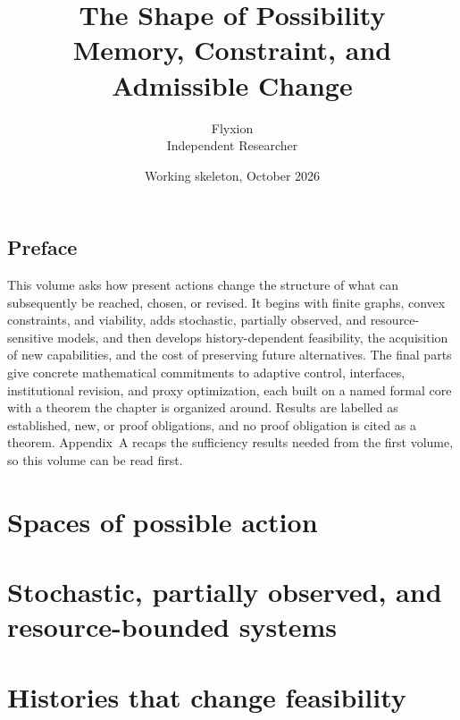 \documentclass[11pt,twoside]{book}
\title{The Shape of Possibility\\[0.4em]\large Memory, Constraint, and Admissible Change}
\author{Flyxion\\Independent Researcher}
\date{Working skeleton, October 2026}
\begin{document}
\frontmatter
\maketitle
\tableofcontents



\chapter*{Preface}
This volume asks how present actions change the structure of what can subsequently be reached, chosen, or revised. It begins with finite graphs, convex constraints, and viability, adds stochastic, partially observed, and resource-sensitive models, and then develops history-dependent feasibility, the acquisition of new capabilities, and the cost of preserving future alternatives. The final parts give concrete mathematical commitments to adaptive control, interfaces, institutional revision, and proxy optimization, each built on a named formal core with a theorem the chapter is organized around. Results are labelled as established, new, or proof obligations, and no proof obligation is cited as a theorem. Appendix~A recaps the sufficiency results needed from the first volume, so this volume can be read first.

\mainmatter

\part{Spaces of possible action}







\part{Stochastic, partially observed, and resource-bounded systems}







\part{Histories that change feasibility}
\end{document}
